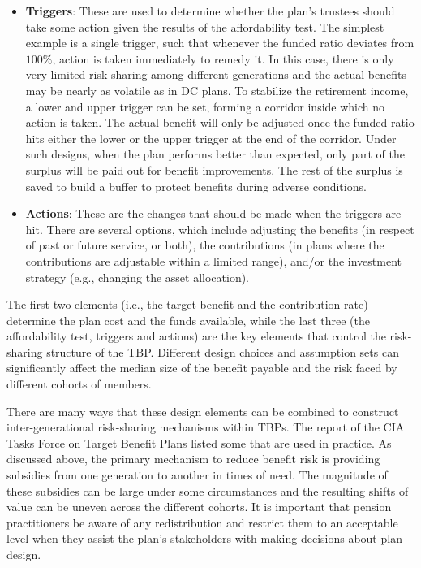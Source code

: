 \documentclass{sfuthesis}
\numberwithin{equation}{chapter}
\begin{document}
\begin{itemize}
			\item \textbf{Triggers}: These are used to determine whether the plan's trustees should take some action given the results of the affordability test. The simplest example is a single trigger, such that whenever the funded ratio deviates from $100\%$, action is taken immediately to remedy it. In this case, there is only very limited risk sharing among different generations and the actual benefits may be nearly as volatile as in DC plans. To stabilize the retirement income, a lower and upper trigger can be set, forming a corridor inside which no action is taken. The actual benefit will only be adjusted once the funded ratio hits either the lower or the upper trigger at the end of the corridor. Under such designs, when the plan performs better than expected, only part of the surplus will be paid out for benefit improvements. The rest of the surplus is saved to build a buffer to protect benefits during adverse conditions. 
			
			\item \textbf{Actions}: These are the changes that should be made when the triggers are hit. There are several options, which include adjusting the benefits (in respect of past or future service, or both), the contributions (in plans where the contributions are adjustable within a limited range), and/or the investment strategy (e.g., changing the asset allocation). 
		\end{itemize}

	

		\justify
		The first two elements (i.e., the target benefit and the contribution rate) determine the plan cost and the funds available, while the last three (the affordability test, triggers and actions) are the key elements that control the risk-sharing structure of the TBP. Different design choices and assumption sets can significantly affect the median size of the benefit payable and the risk faced by different cohorts of members. 

	

		\justify
		There are many ways that these design elements can be combined to construct inter-generational risk-sharing mechanisms within TBPs. The report of the CIA Tasks Force on Target Benefit Plans \citep{cia2015b} listed some that are used in practice. As discussed above, the primary mechanism to reduce benefit risk is providing subsidies from one generation to another in times of need. The magnitude of these subsidies can be large under some circumstances and the resulting shifts of value can be uneven across the different cohorts. It is important that pension practitioners be aware of any redistribution and restrict them to an acceptable level when they assist the plan's stakeholders with making decisions about plan design.
\end{document}
